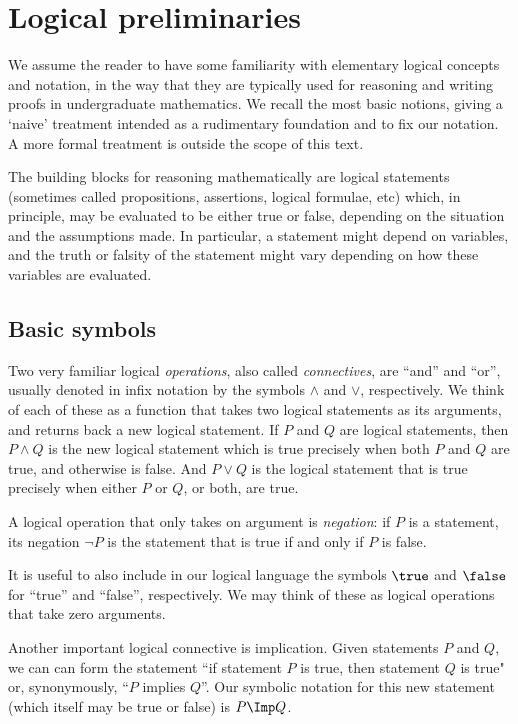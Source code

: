 

\section{Logical preliminaries}
\label{sec:logical-prelim}

We assume the reader to have some familiarity with elementary logical concepts and notation, in the way that they are typically used for reasoning and writing proofs in undergraduate mathematics. We recall the most basic notions, giving a `naive' treatment  intended as a rudimentary foundation and to fix our notation. A more formal treatment is outside the scope of this text. 

The building blocks for reasoning mathematically are logical statements (sometimes called propositions, assertions, logical formulae, etc) which, in principle, may be evaluated to be either true or false, depending on the situation and the assumptions made.  In particular, a statement might depend on variables, and the truth or falsity of the statement might vary depending on how these variables are evaluated. 

\subsection{Basic symbols}

Two very familiar logical \emph{operations}, also called \emph{connectives}, are ``and'' and ``or'', usually denoted in infix notation by the symbols $\wedge$ and $\vee$, respectively. We think of each of these as a function that takes two logical statements as its arguments, and returns back a new logical statement. If $P$ and $Q$ are logical statements, then $P \wedge Q$ is the new logical statement which is true precisely when both $P$ and $Q$ are true, and otherwise is false. And $P \vee Q$ is the logical statement that is true precisely when either $P$ or $Q$, or both, are true.

A logical operation that only takes on argument is \emph{negation}: if $P$ is a statement, its negation $\lnot P$ is the statement that is true if and only if $P$ is false. 

It is useful to also include in our logical language the symbols $\true$ and $\false$ for ``true'' and ``false'', respectively. 
We may think of these as logical operations that take zero arguments. 

Another important logical connective is implication. Given statements $P$ and $Q$, we can can form the statement ``if statement $P$ is true, then statement $Q$ is true" or, synonymously, ``$P$ implies $Q$''. Our symbolic notation for this new statement (which itself may be true or false) is $P \Imp Q$. 

